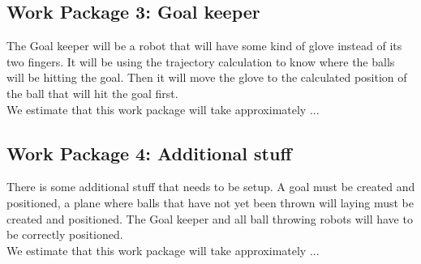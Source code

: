 \documentclass[12pt,pdftex,a4paper]{article}
\begin{document}
\subsection*{Work Package 3: Goal keeper}
The Goal keeper will be a robot that will have some kind of glove instead of its two fingers.
It will be using the trajectory calculation to know where the balls will be hitting the goal.
Then it will move the glove to the calculated position of the ball that will hit the goal first. \\
$ $ \\
We estimate that this work package will take approximately ...

\subsection*{Work Package 4: Additional stuff}
There is some additional stuff that needs to be setup.
A goal must be created and positioned, a plane where balls that have not yet been thrown will laying must be created and positioned.
The Goal keeper and all ball throwing robots will have to be correctly positioned. \\
$ $ \\
We estimate that this work package will take approximately ...

\end{document}
